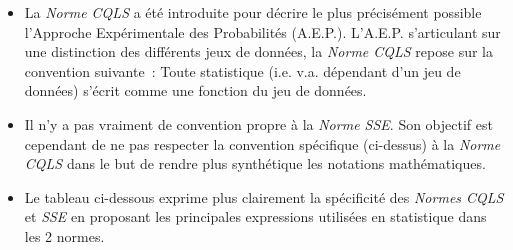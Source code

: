 \documentclass[10pt]{article}
\begin{document}
\begin{itemize}
\item La \textit{Norme CQLS} a été introduite pour décrire le plus précisément possible l'Approche Expérimentale des Probabilités (A.E.P.).  L'A.E.P. s'articulant sur une distinction des différents jeux de données, la \textit{Norme CQLS} repose sur la convention suivante~: Toute statistique (i.e. v.a. dépendant d'un jeu de données) s'écrit comme une fonction du jeu de données.
\item Il n'y a pas vraiment de convention propre à la \textit{Norme SSE}. Son objectif est cependant  de ne pas respecter la convention spécifique (ci-dessus) à la \textit{Norme CQLS} dans le but de rendre plus synthétique les notations mathématiques. 
\item Le tableau ci-dessous exprime plus clairement la spécificité des \textit{Normes CQLS} et \textit{SSE} en proposant les principales expressions utilisées en statistique dans les 2 normes. 



\end{itemize}
\end{document}
